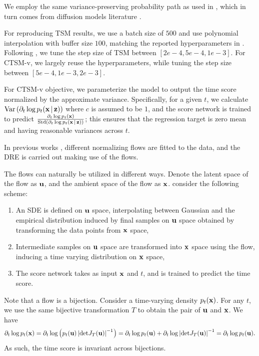 We employ the same variance-preserving probability path as used in \citet{choi2022densityratio}, which in turn comes from diffusion models literature \citep{ho2020ddpm,song2021sde}.

For reproducing TSM results, we use a batch size of $500$ and use polynomial interpolation with buffer size $100$, matching the reported hyperparameters in \citet{choi2022densityratio}. Following \citet{choi2022densityratio}, we tune the step size of TSM between $[2e-4, 5e-4, 1e-3]$. For CTSM-v, we largely reuse the hyperparameters, while tuning the step size between $[5e-4, 1e-3, 2e-3]$.

For CTSM-v objective, we parameterize the model to output the time score normalized by the approximate variance. Specifically, for a given $t$, we calculate $\text{Var}\left(\partial_{t}\log p_{t}(\operatorname{\mathbf{x}}|\operatorname{\mathbf{z}})\right)$ where $c$ is assumed to be $1$, and the score network is trained to predict $\frac{\partial_{t}\log p_{t}(\operatorname{\mathbf{x}})}{\text{Std}\left(\partial_{t}\log p_{t}(\operatorname{\mathbf{x}}|\operatorname{\mathbf{z}})\right)}$; this ensures that the regression target is zero mean and having reasonable variances across $t$.

In previous works \citet{Rhodes2020,choi2022densityratio}, different normalizing flows are fitted to the data, and the DRE is carried out making use of the flows.

The flows can naturally be utilized in different ways. Denote the latent space of the flow as $\operatorname{\mathbf{u}}$, and the ambient space of the flow as $\operatorname{\mathbf{x}}$. \citet{choi2022densityratio} consider the following scheme: 
\begin{enumerate}
\item An SDE is defined on $\operatorname{\mathbf{u}}$ space, interpolating between Gaussian and the empirical distribution induced by final samples on $\operatorname{\mathbf{u}}$ space obtained by transforming the data points from $\operatorname{\mathbf{x}}$ space, 
\item Intermediate samples on $\operatorname{\mathbf{u}}$ space are transformed into $\operatorname{\mathbf{x}}$ space using the flow, inducing a time varying distribution on $\operatorname{\mathbf{x}}$ space,
\item The score network takes as input $\operatorname{\mathbf{x}}$ and $t$, and is trained to predict the time score.
\end{enumerate}

Note that a flow is a bijection. Consider a time-varying density $p_{t}(\operatorname{\mathbf{x}})$. For any $t$, we use the same bijective transformation $T$ to obtain the pair of $\operatorname{\mathbf{u}}$ and $\operatorname{\mathbf{x}}$. We have
\begin{equation}
\partial_{t}\log p_{t}(\operatorname{\mathbf{x}}) = \partial_{t}\log \left(p_{t}(\operatorname{\mathbf{u}})\left\vert\text{det}J_{T}(\operatorname{\mathbf{u}})\right\vert^{-1}\right) = \partial_{t}\log p_{t}(\operatorname{\mathbf{u}}) + \partial_{t}\log \left\vert\text{det}J_{T}(\operatorname{\mathbf{u}})\right\vert^{-1}=\partial_{t}\log p_{t}(\operatorname{\mathbf{u}}).
\end{equation}
As such, the time score is invariant across bijections.

